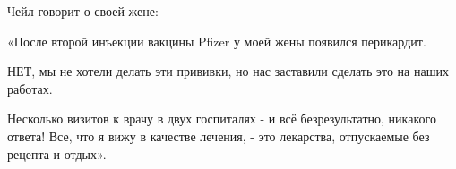 Чейл говорит о своей жене:

«После второй инъекции вакцины Pfizer у моей жены появился перикардит.

НЕТ, мы не хотели делать эти прививки, но нас заставили сделать это на наших
работах.

Несколько визитов к врачу в двух госпиталях - и всё безрезультатно, никакого
ответа! Все, что я вижу в качестве лечения, - это лекарства, отпускаемые без
рецепта и отдых».

